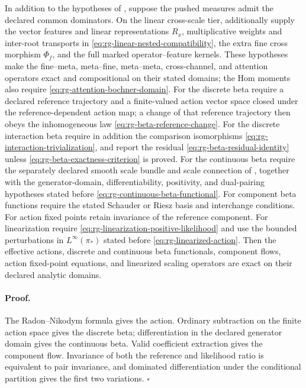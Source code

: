 In addition to the hypotheses of ,
suppose the pushed measures admit the declared common dominators.  On the
linear cross-scale tier, additionally supply the vector features and linear
representations $R_x$, multiplicative weights and inter-root transports in
\eqref{eq:rg-linear-nested-compatibility}, the extra fine cross morphism
$\Phi_f$, and the full marked operator--feature kernels.  These hypotheses
make the fine--meta, meta--fine, meta--meta, cross-channel, and attention
operators exact and compositional on their stated domains; the Hom moments
also require \eqref{eq:rg-attention-bochner-domain}.  For the discrete beta
require a declared reference trajectory and a finite-valued action vector
space closed under the reference-dependent action map; a change of that
reference trajectory then obeys the inhomogeneous law
\eqref{eq:rg-beta-reference-change}.  For the discrete interaction beta require
in addition the comparison isomorphisms
\eqref{eq:rg-interaction-trivialization}, and report the residual
\eqref{eq:rg-beta-residual-identity} unless
\eqref{eq:rg-beta-exactness-criterion} is proved.  For the continuous beta
require the separately declared smooth scale bundle and scale connection of
, together with the generator-domain,
differentiability, positivity, and dual-pairing hypotheses stated before
\eqref{eq:rg-continuous-beta-functional}.  For component beta functions
require the stated Schauder or Riesz basis and interchange conditions.  For
action fixed points retain invariance of the reference component.  For
linearization require \eqref{eq:rg-linearization-positive-likelihood} and use
the bounded perturbations in $L^\infty(\pi_*)$ stated before
\eqref{eq:rg-linearized-action}.  Then the
effective actions, discrete and continuous beta functionals, component flows,
action fixed-point equations, and linearized scaling operators are exact on
their declared analytic domains.  

\paragraph{Proof.}
The Radon--Nikodym formula gives the action.  Ordinary subtraction on the
finite action space gives the discrete beta; differentiation in the declared
generator domain gives the continuous beta.  Valid coefficient extraction
gives the component flow.  Invariance of both the reference and likelihood
ratio is equivalent to pair invariance, and dominated differentiation under
the conditional partition gives the first two variations.  $\square$

